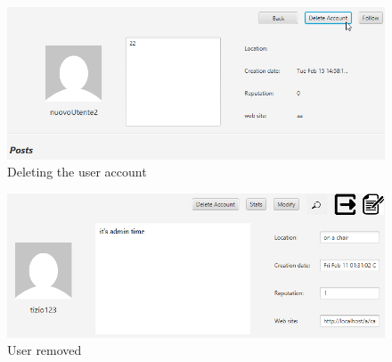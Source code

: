 \documentclass[11pt]{report}
\begin{document}
\begin{figure}[H]
  \centering
  \includegraphics[width=\textwidth,keepaspectratio=true]{img/user_manual/RimuovereAltroUtente3.png}
  \caption{Deleting the user account}
  \label{fig:RimuovereAltroUtente3}
\end{figure}
\begin{figure}[H]
  \centering
  \includegraphics[width=\textwidth,keepaspectratio=true]{img/user_manual/RimuovereAltroUtente4.png}
  \caption{User removed}
  \label{fig:RimuovereAltroUtente4}
\end{figure}
\end{document}
